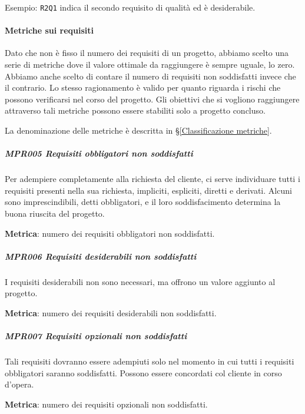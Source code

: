 		Esempio: \texttt{R2Q1} indica il secondo requisito di qualità ed è desiderabile.


		\paragraph{Metriche sui requisiti}\label{MetricheAdR}
		Dato che non è fisso il numero dei requisiti di un progetto, abbiamo scelto una serie di metriche dove il valore ottimale da raggiungere è sempre uguale, lo zero. Abbiamo anche scelto di contare il numero di requisiti non soddisfatti invece che il contrario. Lo stesso ragionamento è valido per quanto	riguarda i rischi che possono verificarsi nel corso del progetto.
		Gli obiettivi che si vogliono raggiungere attraverso tali metriche possono essere stabiliti solo a progetto concluso.

		La denominazione delle metriche è descritta in \S\ref{Classificazione metriche}.

		\subparagraph{MPR005 Requisiti obbligatori non soddisfatti}
		Per adempiere completamente alla richiesta del cliente, ci serve individuare tutti i requisiti presenti nella sua richiesta, impliciti, espliciti, diretti e derivati. Alcuni sono imprescindibili, detti obbligatori, e il loro soddisfacimento determina la buona riuscita del progetto.

		\textbf{Metrica}: numero dei requisiti obbligatori non soddisfatti.

		\subparagraph{MPR006 Requisiti desiderabili non soddisfatti}
		I requisiti desiderabili non sono necessari, ma offrono un valore aggiunto al progetto.

		\textbf{Metrica}: numero dei requisiti desiderabili non soddisfatti.

		\subparagraph{MPR007 Requisiti opzionali non soddisfatti}
		Tali requisiti dovranno essere adempiuti solo nel momento in cui tutti i requisiti obbligatori saranno soddisfatti.
		Possono essere concordati col cliente in corso d'opera.

		\textbf{Metrica}: numero dei requisiti opzionali non soddisfatti.



